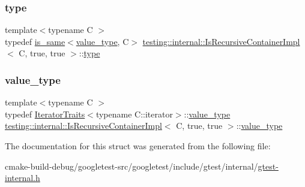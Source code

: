 \subsubsection{\texorpdfstring{type}{type}}
{\footnotesize\ttfamily template$<$typename C $>$ \\
typedef \mbox{\hyperlink{structtesting_1_1internal_1_1is__same}{is\+\_\+same}}$<$\mbox{\hyperlink{structtesting_1_1internal_1_1IsRecursiveContainerImpl_3_01C_00_01true_00_01true_01_4_a8bbf5f5dec769e84b6f5a2e1fdb503e8}{value\+\_\+type}}, C$>$ \mbox{\hyperlink{structtesting_1_1internal_1_1IsRecursiveContainerImpl}{testing\+::internal\+::\+Is\+Recursive\+Container\+Impl}}$<$ C, true, true $>$\+::\mbox{\hyperlink{structtesting_1_1internal_1_1IsRecursiveContainerImpl_3_01C_00_01true_00_01true_01_4_a6bf4fa07dd1c22c5d0ca4ed99c546e9c}{type}}}

\mbox{\label{structtesting_1_1internal_1_1IsRecursiveContainerImpl_3_01C_00_01true_00_01true_01_4_a8bbf5f5dec769e84b6f5a2e1fdb503e8}} 
\subsubsection{\texorpdfstring{value\_type}{value\_type}}
{\footnotesize\ttfamily template$<$typename C $>$ \\
typedef \mbox{\hyperlink{structtesting_1_1internal_1_1IteratorTraits}{Iterator\+Traits}}$<$typename C\+::iterator$>$\+::\mbox{\hyperlink{structtesting_1_1internal_1_1IsRecursiveContainerImpl_3_01C_00_01true_00_01true_01_4_a8bbf5f5dec769e84b6f5a2e1fdb503e8}{value\+\_\+type}} \mbox{\hyperlink{structtesting_1_1internal_1_1IsRecursiveContainerImpl}{testing\+::internal\+::\+Is\+Recursive\+Container\+Impl}}$<$ C, true, true $>$\+::\mbox{\hyperlink{structtesting_1_1internal_1_1IsRecursiveContainerImpl_3_01C_00_01true_00_01true_01_4_a8bbf5f5dec769e84b6f5a2e1fdb503e8}{value\+\_\+type}}}



The documentation for this struct was generated from the following file\+:\begin{DoxyCompactItemize}
\item 
cmake-\/build-\/debug/googletest-\/src/googletest/include/gtest/internal/\mbox{\hyperlink{gtest-internal_8h}{gtest-\/internal.\+h}}\end{DoxyCompactItemize}
